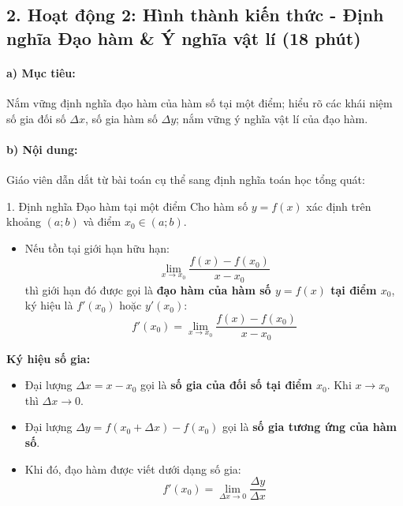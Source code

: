 \documentclass[12pt, a4paper]{article}
\begin{document}
\subsection*{2. Hoạt động 2: Hình thành kiến thức - Định nghĩa Đạo hàm \& Ý nghĩa vật lí (18 phút)}

\paragraph{a) Mục tiêu:} Nắm vững định nghĩa đạo hàm của hàm số tại một điểm; hiểu rõ các khái niệm số gia đối số $\Delta x$, số gia hàm số $\Delta y$; nắm vững ý nghĩa vật lí của đạo hàm.

\paragraph{b) Nội dung:} Giáo viên dẫn dắt từ bài toán cụ thể sang định nghĩa toán học tổng quát:

\begin{pedabox}{1. Định nghĩa Đạo hàm tại một điểm}
Cho hàm số $y = f(x)$ xác định trên khoảng $(a; b)$ và điểm $x_0 \in (a; b)$.
\begin{itemize}[leftmargin=0.5cm]
    \item Nếu tồn tại giới hạn hữu hạn:
    \begin{equation}
        \lim_{x \to x_0} \dfrac{f(x) - f(x_0)}{x - x_0}
    \end{equation}
    thì giới hạn đó được gọi là \textbf{đạo hàm của hàm số $y = f(x)$ tại điểm $x_0$}, ký hiệu là $f'(x_0)$ hoặc $y'(x_0)$:
    \begin{equation}
        f'(x_0) = \lim_{x \to x_0} \dfrac{f(x) - f(x_0)}{x - x_0}
    \end{equation}
\end{itemize}
\textbf{Ký hiệu số gia:}
\begin{itemize}[leftmargin=0.5cm]
    \item Đại lượng $\Delta x = x - x_0$ gọi là \textbf{số gia của đối số tại điểm $x_0$}. Khi $x \to x_0$ thì $\Delta x \to 0$.
    \item Đại lượng $\Delta y = f(x_0 + \Delta x) - f(x_0)$ gọi là \textbf{số gia tương ứng của hàm số}.
    \item Khi đó, đạo hàm được viết dưới dạng số gia:
    \begin{equation}
        f'(x_0) = \lim_{\Delta x \to 0} \dfrac{\Delta y}{\Delta x}
    \end{equation}
\end{itemize}
\end{pedabox}
\end{document}
